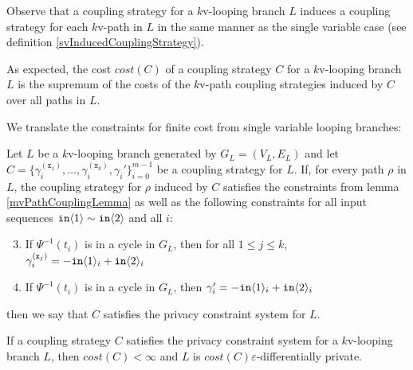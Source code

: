 Observe that a coupling strategy for a $k$v-looping branch $L$ induces a coupling strategy for each $k$v-path in $L$ in the same manner as the single variable case (see definition \ref{svInducedCouplingStrategy}). 

As expected, the cost $cost(C)$ of a coupling strategy $C$ for a $k$v-looping branch $L$ is the supremum of the costs of the $k$v-path coupling strategies induced by $C$ over all paths in $L$.

We translate the constraints for finite cost from single variable looping branches: 

\begin{defn}\label{mvPrivacyConstraintSystem}
    Let $L$ be a $k$v-looping branch generated by $G_L = (V_L, E_L)$ and let $C = \{\gamma_i^{(\texttt{x}_1)},\ldots, \gamma_i^{(\texttt{x}_k)}, \gamma_i'\}_{i=0}^{m-1}$ be a coupling strategy for $L$. If, for every path $\rho$ in $L$, the coupling strategy for $\rho$ induced by $C$ satisfies the constraints from lemma \ref{mvPathCouplingLemma} as well as the following constraints for all input sequences $\texttt{in}\langle1 \rangle\sim\texttt{in}\langle2 \rangle$ and all $i$: \begin{enumerate}
        \setcounter{enumi}{2}
        \item If $\Psi^{-1}(t_i)$ is in a cycle in $G_L$, then for all $1\leq j\leq k$, $\gamma_i^{(\texttt{x}_j)} = -\texttt{in}\langle1 \rangle_i+\texttt{in}\langle2 \rangle_i$
        \item If $\Psi^{-1}(t_i)$ is in a cycle in $G_L$, then $\gamma_i' = -\texttt{in}\langle1 \rangle_i+\texttt{in}\langle2 \rangle_i$
    \end{enumerate}
    then we say that $C$ satisfies the privacy constraint system for $L$. 
\end{defn}

\begin{lemma}
    If a coupling strategy $C$ satisfies the privacy constraint system for a $k$v-looping branch $L$, then $cost(C)<\infty$ and $L$ is $cost(C)\varepsilon$-differentially private. 
\end{lemma}

